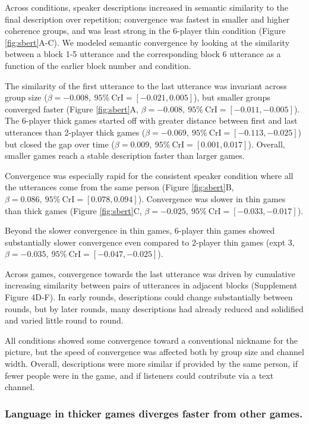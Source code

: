 \documentclass[
  english,
  a4paper,
]{article}
\begin{document}
Across conditions, speaker descriptions increased in semantic similarity to the final description over repetition; convergence was fastest in smaller and higher coherence groups, and was least strong in the 6-player thin condition (Figure \ref{fig:sbert}A-C). We modeled semantic convergence by looking at the similarity between a block 1-5 utterance and the corresponding block 6 utterance as a function of the earlier block number and condition.

The similarity of the first utterance to the last utterance was invariant across group size (\(\beta=-0.008,\:95\%\:\mathrm{CrI}=[-0.021, 0.005]\)), but smaller groups converged faster (Figure \ref{fig:sbert}A, \(\beta=-0.008,\:95\%\:\mathrm{CrI}=[-0.011, -0.005]\)). The 6-player thick games started off with greater distance between first and last utterances than 2-player thick games (\(\beta=-0.069,\:95\%\:\mathrm{CrI}=[-0.113, -0.025]\)) but closed the gap over time (\(\beta=0.009,\:95\%\:\mathrm{CrI}=[0.001, 0.017]\)). Overall, smaller games reach a stable description faster than larger games.

Convergence was especially rapid for the consistent speaker condition where all the utterances come from the same person (Figure \ref{fig:sbert}B, \(\beta=0.086,\:95\%\:\mathrm{CrI}=[0.078, 0.094]\)). Convergence was slower in thin games than thick games (Figure \ref{fig:sbert}C, \(\beta=-0.025,\:95\%\:\mathrm{CrI}=[-0.033, -0.017]\)).

Beyond the slower convergence in thin games, 6-player thin games showed substantially slower convergence even compared to 2-player thin games (expt 3, \(\beta=-0.035,\:95\%\:\mathrm{CrI}=[-0.047, -0.025]\)).

Across games, convergence towards the last utterance was driven by cumulative increasing similarity between pairs of utterances in adjacent blocks (Supplement Figure 4D-F). In early rounds, descriptions could change substantially between rounds, but by later rounds, many descriptions had already reduced and solidified and varied little round to round.

All conditions showed some convergence toward a conventional nickname for the picture, but the speed of convergence was affected both by group size and channel width. Overall, descriptions were more similar if provided by the same person, if fewer people were in the game, and if listeners could contribute via a text channel.

\hypertarget{language-in-thicker-games-diverges-faster-from-other-games.}{%
\subsubsection{Language in thicker games diverges faster from other games.}\label{language-in-thicker-games-diverges-faster-from-other-games.}}
\end{document}
